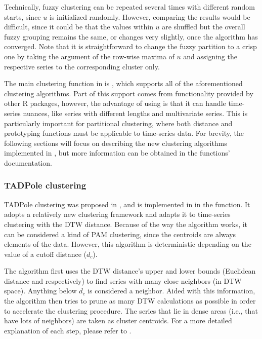 Technically, fuzzy clustering can be repeated several times with different random starts,
since $u$ is initialized randomly.
However, comparing the results would be difficult,
since it could be that the values within $u$ are shuffled but the overall fuzzy grouping remains the same,
or changes very slightly,
once the algorithm has converged.
Note that it is straightforward to change the fuzzy partition to a crisp one by taking the argument of the row-wise maxima of $u$ and assigning the respective series to the corresponding cluster only.

The main clustering function in \dtwclust{} is ,
which supports all of the aforementioned clustering algorithms.
Part of this support comes from functionality provided by other R packages,
however, the advantage of using \dtwclust{} is that it can handle time-series nuances,
like series with different lengths and multivariate series.
This is particularly important for partitional clustering,
where both distance and prototyping functions must be applicable to time-series data.
For brevity, the following sections will focus on describing the new clustering algorithms implemented in \dtwclust{},
but more information can be obtained in the functions' documentation.

\subsubsection{TADPole clustering}
\label{sec:tadpole}

TADPole clustering was proposed in \citet{begum2015},
and is implemented in \dtwclust{} in the  function.
It adopts a relatively new clustering framework and adapts it to time-series clustering with the DTW distance.
Because of the way the algorithm works,
it can be considered a kind of PAM clustering,
since the centroids are always elements of the data.
However, this algorithm is deterministic depending on the value of a cutoff distance ($d_c$).

The algorithm first uses the DTW distance's upper and lower bounds
(Euclidean distance and  respectively)
to find series with many close neighbors (in DTW space).
Anything below $d_c$ is considered a neighbor.
Aided with this information,
the algorithm then tries to prune as many DTW calculations as possible in order to accelerate the clustering procedure.
The series that lie in dense areas
(i.e., that have lots of neighbors)
are taken as cluster centroids.
For a more detailed explanation of each step,
please refer to \citet{begum2015}.


